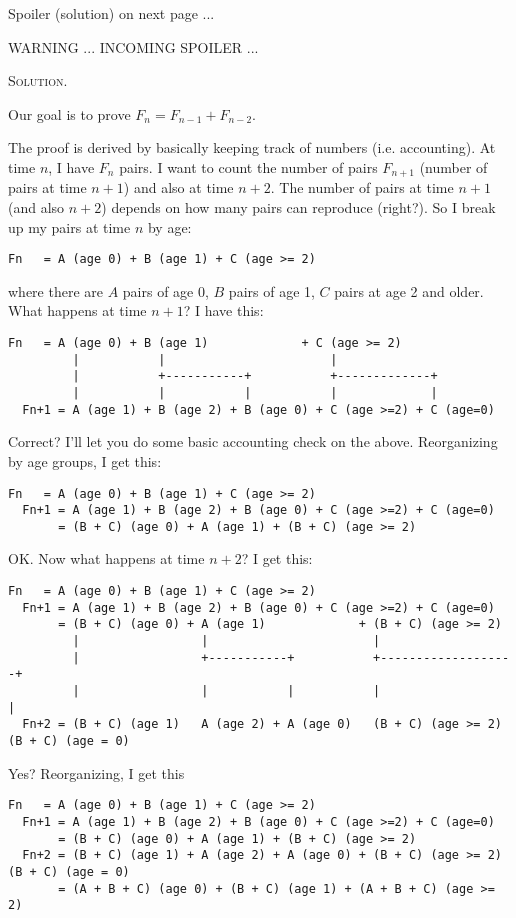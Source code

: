 Spoiler (solution) on next page ...

\newpage
WARNING ... INCOMING SPOILER ...

\textsc{Solution.}

Our goal is to prove $F_n = F_{n-1} + F_{n-2}$.

The proof is derived by basically keeping track of numbers (i.e. accounting).
At time $n$, I have $F_n$ pairs.
I want to count the number of pairs
$F_{n+1}$ (number of pairs at time $n + 1$) and also at time $n + 2$.
The number of pairs at time $n + 1$ (and also $n + 2$) depends on
how many pairs can reproduce (right?). So I break up my pairs at time $n$
by age:
\begin{Verbatim}[fontsize=\footnotesize]
  Fn   = A (age 0) + B (age 1) + C (age >= 2) 
\end{Verbatim}
where there are $A$ pairs of age 0, $B$ pairs of age 1, $C$ pairs at age 2 and
older.
What happens at time $n + 1$? I have this:
\begin{Verbatim}[fontsize=\footnotesize]
  Fn   = A (age 0) + B (age 1)             + C (age >= 2)
         |           |                       |
         |           +-----------+           +-------------+
         |           |           |           |             |
  Fn+1 = A (age 1) + B (age 2) + B (age 0) + C (age >=2) + C (age=0)
  \end{Verbatim}
Correct? I'll let you do some basic accounting check on the above.
Reorganizing by age groups, I get this:
\begin{Verbatim}[fontsize=\footnotesize]
  Fn   = A (age 0) + B (age 1) + C (age >= 2)
  Fn+1 = A (age 1) + B (age 2) + B (age 0) + C (age >=2) + C (age=0)
       = (B + C) (age 0) + A (age 1) + (B + C) (age >= 2)
  \end{Verbatim}
OK. Now what happens at time $n + 2$? I get this:
\begin{Verbatim}[fontsize=\footnotesize]
  Fn   = A (age 0) + B (age 1) + C (age >= 2)
  Fn+1 = A (age 1) + B (age 2) + B (age 0) + C (age >=2) + C (age=0)
       = (B + C) (age 0) + A (age 1)             + (B + C) (age >= 2)
         |                 |                       |
         |                 +-----------+           +-------------------+
         |                 |           |           |                   |
  Fn+2 = (B + C) (age 1)   A (age 2) + A (age 0)   (B + C) (age >= 2)  (B + C) (age = 0)
\end{Verbatim}
Yes? Reorganizing, I get this
\begin{Verbatim}[fontsize=\footnotesize]
  Fn   = A (age 0) + B (age 1) + C (age >= 2)
  Fn+1 = A (age 1) + B (age 2) + B (age 0) + C (age >=2) + C (age=0)
       = (B + C) (age 0) + A (age 1) + (B + C) (age >= 2)
  Fn+2 = (B + C) (age 1) + A (age 2) + A (age 0) + (B + C) (age >= 2)  (B + C) (age = 0)
       = (A + B + C) (age 0) + (B + C) (age 1) + (A + B + C) (age >= 2)
  \end{Verbatim}
